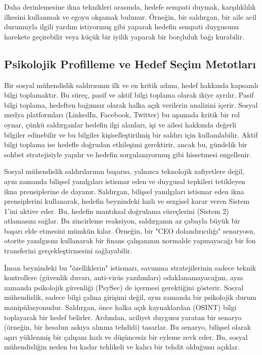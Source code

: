Daha derinlemesine ikna teknikleri arasında, hedefe sempati duymak, karşılıklılık ilkesini kullanmak ve egoyu okşamak bulunur. Örneğin, bir saldırgan, bir aile acil durumuyla ilgili yardım istiyormuş gibi yaparak hedefin sempati duygusunu harekete geçirebilir veya küçük bir iyilik yaparak bir borçluluk bağı kurabilir.

\subsection{Psikolojik Profilleme ve Hedef Seçim Metotları}

Bir sosyal mühendislik saldırısının ilk ve en kritik adımı, hedef hakkında kapsamlı bilgi toplamaktır. Bu süreç, pasif ve aktif bilgi toplama olarak ikiye ayrılır. Pasif bilgi toplama, hedeften bağımsız olarak halka açık verilerin analizini içerir. Sosyal medya platformları (LinkedIn, Facebook, Twitter) bu aşamada kritik bir rol oynar, çünkü saldırganlar hedefin ilgi alanları, işi ve ailesi hakkında değerli bilgiler edinebilir ve bu bilgiler kişiselleştirilmiş bir saldırı için kullanılabilir. Aktif bilgi toplama ise hedefle doğrudan etkileşimi gerektirir, ancak bu, gündelik bir sohbet stratejisiyle yapılır ve hedefin sorgulanıyormuş gibi hissetmesi engellenir.

Sosyal mühendislik saldırılarının başarısı, yalnızca teknolojik zafiyetlere değil, aynı zamanda bilişsel yanılgıları istismar eden ve duygusal tepkileri tetikleyen ikna prensiplerine de dayanır. Saldırgan, bilişsel yanılgıları istismar eden ikna prensiplerini kullanarak, hedefin beynindeki hızlı ve sezgisel karar veren Sistem 1'ini aktive eder. Bu, hedefin mantıksal doğrulama süreçlerini (Sistem 2) atlamasını sağlar. Bu zincirleme reaksiyon, saldırganın az çabayla büyük bir başarı elde etmesini mümkün kılar. Örneğin, bir "CEO dolandırıcılığı" senaryosu, otorite yanılgısını kullanarak bir finans çalışanının normalde yapmayacağı bir fon transferini gerçekleştirmesini sağlayabilir.

İnsan beynindeki bu "özelliklerin" istismarı, savunma stratejilerinin sadece teknik kontrollere (güvenlik duvarı, anti-virüs yazılımları) odaklanamayacağını, aynı zamanda psikolojik güvenliği (PsySec) de içermesi gerektiğini gösterir. Sosyal mühendislik, sadece bilgi çalma girişimi değil, aynı zamanda bir psikolojik durum manipülasyonudur. Saldırgan, önce halka açık kaynaklardan (OSINT) bilgi toplayarak bir hedef belirler. Ardından, aciliyet duygusu yaratan bir senaryo (örneğin, bir hesabın askıya alınma tehdidi) tasarlar. Bu senaryo, bilişsel olarak aşırı yüklenmiş bir çalışanı hızlı ve düşüncesiz bir eyleme sevk eder. Bu, sosyal mühendisliğin neden bu kadar tehlikeli ve kalıcı bir tehdit olduğunu açıklar.

